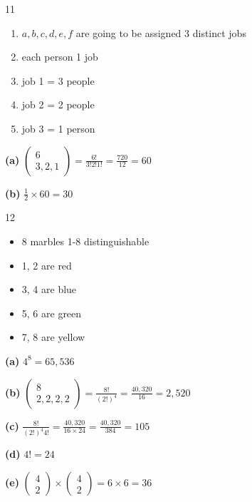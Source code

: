 \documentclass[12 pt]{article}
\begin{document}
    \begin{exercise}{11}
    \hfill

    \begin{enumerate}
        \item $a, b, c, d, e, f$ are going to be assigned 3 distinct jobs
        \item each person 1 job
        \item job 1 = 3 people
        \item job 2 = 2 people
        \item job 3 = 1 person
    \end{enumerate}

    \textbf{(a)} $\begin{pmatrix}
        6 \\
        3, 2, 1
    \end{pmatrix} = \frac{6!}{3!2!1!} = \frac{720}{12} = 60$

    \textbf{(b)} $\frac{1}{2} \times 60 = 30$
        
    \end{exercise}



    \begin{exercise}{12}
    \hfill

    \begin{itemize}
        \item 8 marbles 1-8 distinguishable 
        \item 1, 2 are red
        \item 3, 4 are blue
        \item 5, 6 are green
        \item 7, 8 are yellow
    \end{itemize}

    \textbf{(a)} $4^8 = 65,536$

    \textbf{(b)} $\begin{pmatrix}
        8 \\
        2, 2, 2, 2
    \end{pmatrix} = \frac{8!}{(2!)^4} = \frac{40,320}{16} = 2,520$

    \textbf{(c)} $\frac{8!}{(2!)^4 4!} = \frac{40,320}{16 \times 24} =\frac{40,320}{384} = 105$

    \textbf{(d)} $4! = 24$

    \textbf{(e)} $\begin{pmatrix}
        4 \\
        2
    \end{pmatrix} \times \begin{pmatrix}
        4 \\ 2
    \end{pmatrix} = 6 \times 6 = 36$
        
    \end{exercise}
\end{document}

